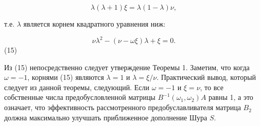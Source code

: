 \documentclass{article}
\begin{document}
\[
\lambda (\lambda + 1) \xi = \lambda (1 - \lambda) \nu,
\]

т.е. \( \lambda \) является корнем квадратного уравнения ниж:

\[
\nu \lambda^2 - (\nu - \omega \xi) \lambda + \xi = 0.
\]
(15)

Из (15) непосредственно следует утверждение Теоремы 1. Заметим, что когда \( \omega = -1 \), корнями (15) являются \( \lambda = 1 \) и \( \lambda = \xi/\nu \). Практический вывод, который следует из данной теоремы, следующий. Если \( \omega = -1 \) и \( \xi = \nu \), то все собственные числа предобусловленной матрицы \( B^{-1}(\omega_1, \omega_2)A \) равны 1, а это означает, что эффективность рассмотренного предобуславливателя матрица \( B_2 \) должна максимально улучшать приближенное дополнение Шура \( S \).
\end{document}

